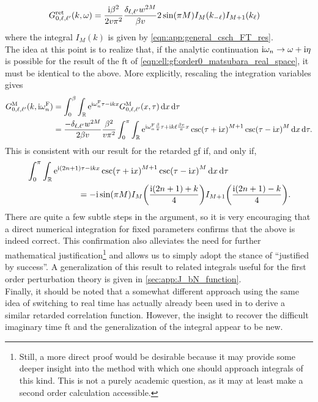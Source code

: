 \begin{align}
G^{\text{ret}}_{0,\ell,\ell'}(k,\omega) &= \frac{\text{i}\beta^2}{2v\pi^2} \frac{\delta_{\ell,\ell'}w^{2M}}{\beta v} 2\sin(\pi M) I_M(k_{-\ell}) I_{M+1}(k_{\ell})
\end{align}
where the integral $I_M(k)$ is given by \autoref{eqn:app:general_csch_FT_res}.\\
The idea at this point is to realize that, if the analytic continuation $\text{i}\omega_n\rightarrow \omega + \text{i} \eta$ is possible for the result of the \gls{ft} of \autoref{eqn:ell:gf:order0_matsubara_real_space}, it must be identical to the above.
More explicitly, rescaling the integration variables gives
\begin{align*}
G^\M_{0,\ell,\ell'}(k,\i\omega_n^\F) &= \intx{0}{\beta}{\intr{\powe{\i\omega_n^\F\tau - \i kx} G^\M_{0,\ell,\ell'}(x,\tau)}{x} }{\tau} \\
&= \frac{-\delta_{\ell,\ell'} w^{2M}}{2\beta v} \frac{\beta^2}{v\pi^2} \intx{0}{\pi}{\intr{\powe{\i \omega_n^\F \frac{\beta }{\pi} \tau + \i k \ell \frac{\beta v}{\pi} x} \csc\kla*{\tau + \i x}^{M+1} \csc\kla*{\tau - \i x}^M }{x} }{\tau}.
\end{align*}
This is consistent with our result for the retarded \gls{gf} if, and only if,
\begin{align*}
&\intx{0}{\pi}{\intr{\powe{\i (2n+1) \tau - \i k x} \csc\kla*{\tau + \i x}^{M+1} \csc\kla*{\tau - \i x}^M }{x} }{\tau}\\
&\qquad\qquad\qquad = -\i \sin(\pi M) I_M\kla*{\frac{\i(2n+1) + k}{4}} I_{M+1}\kla*{\frac{\i(2n+1) - k}{4}}.
\end{align*}
There are quite a few subtle steps in the argument, so it is very encouraging that a direct numerical integration for fixed parameters confirms that the above is indeed correct.
This confirmation also alleviates the need for further mathematical justification\footnote{Still, a more direct proof would be desirable because it may provide some deeper insight into the method with which one should approach integrals of this kind. This is not a purely academic question, as it may at least make a second order calculation accessible.} and allows us to simply adopt the stance of ``justified by success''. 
A generalization of this result to related integrals useful for the first order perturbation theory is given in \autoref{sec:app:J_bN_function}.\\
Finally, it should be noted that a somewhat different approach using the same idea of switching to real time has actually already been used in \cite[\sapp C]{Giamarchi_2004} to derive a similar retarded correlation function.
However, the insight to recover the difficult imaginary time \gls{ft} and the generalization of the integral appear to be new.
